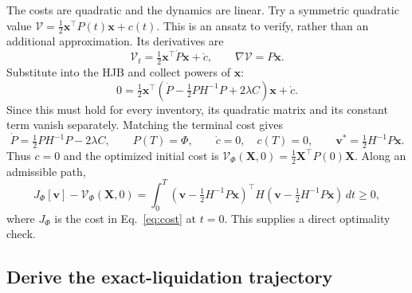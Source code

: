 \documentclass[11pt,a4paper]{article}
\begin{document}
The costs are quadratic and the dynamics are linear. Try a symmetric
quadratic value
$\mathcal V=\tfrac12\mathbf x^\top P(t)\mathbf x+c(t)$.
This is an ansatz to verify, rather than an additional approximation.
Its derivatives are
\[
 \mathcal V_t=\tfrac12\mathbf x^\top\dot P\mathbf x+\dot c,
 \qquad\nabla\mathcal V=P\mathbf x.
\]
Substitute into the HJB and collect powers of $\mathbf x$:
\[
 0=\tfrac12\mathbf x^\top
 \left(\dot P-\tfrac12PH^{-1}P+2\lambda C\right)\mathbf x+\dot c.
\]
Since this must hold for every inventory, its quadratic matrix and its
constant term vanish separately. Matching the terminal cost gives
\begin{equation}
 \dot P=\tfrac12PH^{-1}P-2\lambda C,\qquad P(T)=\Phi,
 \qquad\dot c=0,\quad c(T)=0,
 \qquad\mathbf v^*=\tfrac12H^{-1}P\mathbf x.
 \label{eq:ric}
\end{equation}
Thus $c=0$ and the optimized initial cost is
$\mathcal V_\Phi(\mathbf X,0)=\tfrac12\mathbf X^\top P(0)\mathbf X$.
Along an admissible path,
\[
 J_\Phi[\mathbf v]-\mathcal V_\Phi(\mathbf X,0)
 =\int_0^T(\mathbf v-\tfrac12H^{-1}P\mathbf x)^\top
 H(\mathbf v-\tfrac12H^{-1}P\mathbf x)\,dt\ge0,
\]
where $J_\Phi$ is the cost in Eq.~\eqref{eq:cost} at $t=0$.
This supplies a direct optimality check.

\subsection*{Derive the exact-liquidation trajectory}
\end{document}
